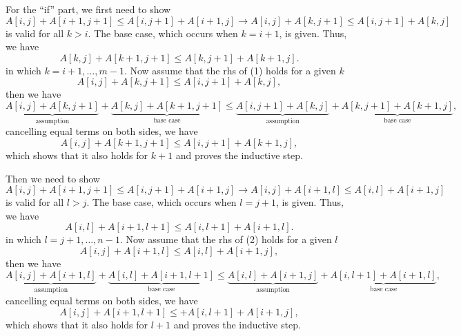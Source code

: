 \begin{enumerate}
\begin{framed}
\begin{enumerate}
      For the ``if'' part, we first need to show
      \begin{equation}
        A[i, j] + A[i + 1, j + 1] \le A[i, j + 1] + A[i + 1, j] \rightarrow A[i, j] + A[k, j + 1] \le A[i, j + 1] + A[k, j]
        \label{eq:p_4_6}
      \end{equation}
      is valid for all $k > i$. The base case, which occurs when $k = i + 1$, is
      given. Thus, we have
      \[
        A[k, j] + A[k + 1, j + 1] \le A[k, j + 1] + A[k + 1, j].
      \]
      in which $k = i + 1, \dots, m - 1$. Now assume that the rhs of (1) holds for a given $k$
      \[
        A[i, j] + A[k, j + 1] \le A[i, j + 1] + A[k, j],
      \]
      then we have
      \[
        \underbrace{A[i, j] + A[k, j + 1]}_\text{assumption} +
        \underbrace{A[k, j] + A[k + 1, j + 1]}_\text{base case} \le
        \underbrace{A[i, j + 1] + A[k, j]}_\text{assumption} +
        \underbrace{A[k, j + 1] + A[k + 1, j]}_\text{base case},
      \]
      cancelling equal terms on both sides, we have
      \[
        A[i, j] + A[k + 1, j + 1] \le A[i, j + 1] + A[k + 1, j],
      \]
      which shows that it also holds for $k + 1$ and proves the inductive step.

      Then we need to show
      \begin{equation}
        A[i, j] + A[i + 1, j + 1] \le A[i, j + 1] + A[i + 1, j] \rightarrow A[i, j] + A[i + 1, l] \le A[i, l] + A[i + 1, j]
      \end{equation}
      is valid for all $l > j$. The base case, which occurs when $l = j + 1$, is
      given. Thus, we have
      \[
        A[i, l] + A[i + 1, l + 1] \le A[i, l + 1] + A[i + 1, l].
      \]
      in which $l = j + 1, \dots, n - 1$. Now assume that the rhs of (2) holds for a given $l$
      \[
        A[i, j] + A[i + 1, l] \le A[i, l] + A[i + 1, j],
      \]
      then we have
      \[
        \underbrace{A[i, j] + A[i + 1, l]}_\text{assumption} +
        \underbrace{A[i, l] + A[i + 1, l + 1]}_\text{base case} \le
        \underbrace{A[i, l] + A[i + 1, j]}_\text{assumption} +
        \underbrace{A[i, l + 1] + A[i + 1, l]}_\text{base case},
      \]
      cancelling equal terms on both sides, we have
      \[
        A[i, j] + A[i + 1, l + 1] \le  + A[i, l + 1] + A[i + 1, j],
      \]
      which shows that it also holds for $l + 1$ and proves the inductive step.


\end{enumerate}
\end{framed}
\end{enumerate}
